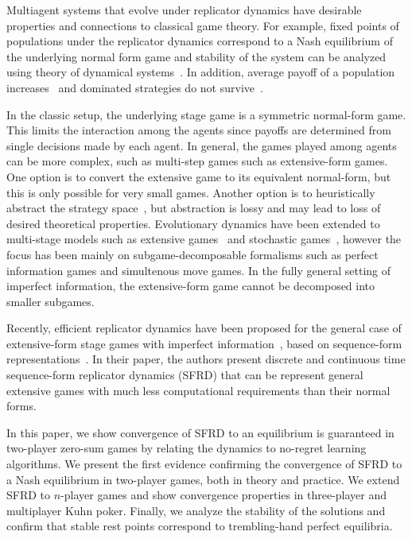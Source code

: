 \documentclass{aamas2014}
\begin{document}
Multiagent systems that evolve under replicator dynamics have desirable properties and connections to classical game theory. 
For example, fixed points of populations under the replicator dynamics correspond to a Nash equilibrium of the underlying normal 
form game and stability of the system can be analyzed using theory of dynamical systems~\cite{FudLev98,Gintis09}. 
In addition, average payoff of a population increases~\cite{HS98} and dominated strategies do not survive~\cite{Gintis09}. 

In the classic setup, the underlying stage game is a symmetric normal-form game. This limits the interaction
among the agents since payoffs are determined from single decisions made by each agent. In general, the games played among agents 
can be more complex, such as multi-step games such as extensive-form games. 
One option is to convert the extensive game to its equivalent normal-form, but this is only possible for very small games. 
Another option is to heuristically abstract the strategy space~\cite{ponsen09b}, but 
abstraction is lossy and may lead to loss of desired theoretical properties.
Evolutionary dynamics have been extended to 
multi-stage models such as extensive games~\cite{Cressman03} and stochastic games~\cite{Flesch13Evolutionary,Hennes09State}, 
however the focus has been mainly on subgame-decomposable formalisms such as perfect information games and
simultenous move games. In the fully general setting of imperfect information, the extensive-form game cannot be 
decomposed into smaller subgames. 

Recently, efficient replicator dynamics have been proposed for the general case of extensive-form stage games with 
imperfect information~\cite{Gatti13Efficient}, based on sequence-form representations~\cite{SequenceFormLPs}. 
In their paper, the authors present discrete and continuous time sequence-form replicator dynamics (SFRD)
that can be represent general extensive games with much less computational requirements than their 
normal forms. 

In this paper, we show convergence of SFRD to an equilibrium is guaranteed in two-player zero-sum games by relating the 
dynamics to no-regret learning algorithms. %
We present the first evidence confirming the convergence of SFRD to a Nash equilibrium in two-player games, both in theory and practice.
We extend SFRD to $n$-player games and show convergence properties in three-player and multiplayer Kuhn poker. 
Finally, we analyze the stability of the solutions and confirm that stable rest points correspond to trembling-hand perfect equilibria.
\end{document}
